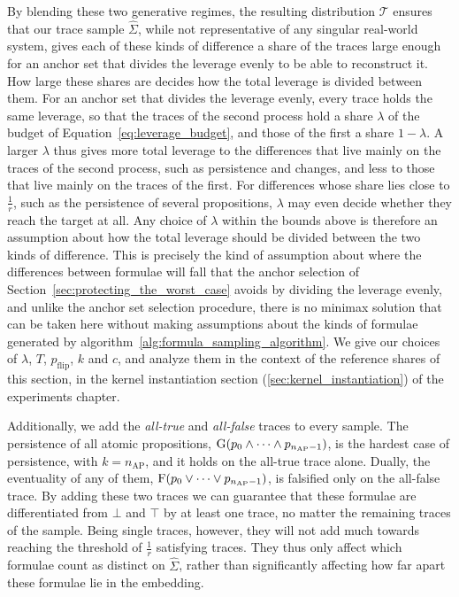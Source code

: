 \documentclass[titlepage,a4paper,11pt]{report}
\begin{document}
    By blending these two generative regimes, the resulting distribution $\mathcal{T}$ ensures that our trace sample $\widehat \Sigma$, while not representative of any singular real-world system, gives each of these kinds of difference a share of the traces large enough for an anchor set that divides the leverage evenly to be able to reconstruct it. How large these shares are decides how the total leverage is divided between them. For an anchor set that divides the leverage evenly, every trace holds the same leverage, so that the traces of the second process hold a share $\lambda$ of the budget of Equation~\eqref{eq:leverage_budget}, and those of the first a share $1-\lambda$. A larger $\lambda$ thus gives more total leverage to the differences that live mainly on the traces of the second process, such as persistence and changes, and less to those that live mainly on the traces of the first. For differences whose share lies close to $\frac1r$, such as the persistence of several propositions, $\lambda$ may even decide whether they reach the target at all. Any choice of $\lambda$ within the bounds above is therefore an assumption about how the total leverage should be divided between the two kinds of difference. This is precisely the kind of assumption about where the differences between formulae will fall that the anchor selection of Section~\ref{sec:protecting_the_worst_case} avoids by dividing the leverage evenly, and unlike the anchor set selection procedure, there is no minimax solution that can be taken here without making assumptions about the kinds of formulae generated by algorithm~\ref{alg:formula_sampling_algorithm}. We give our choices of $\lambda$, $T$, $p_{\text{flip}}$, $k$ and $c$, and analyze them in the context of the reference shares of this section, in the kernel instantiation section (\ref{sec:kernel_instantiation}) of the experiments chapter.
 
    Additionally, we add the \textit{all-true} and \textit{all-false} traces to every sample. The persistence of all atomic propositions, $\text{G}(p_0\land\dots\land p_{n_{\text{AP}}-1})$, is the hardest case of persistence, with $k=n_{\text{AP}}$, and it holds on the all-true trace alone. Dually, the eventuality of any of them, $\text{F}(p_0\lor\dots\lor p_{n_{\text{AP}}-1})$, is falsified only on the all-false trace. By adding these two traces we can guarantee that these formulae are differentiated from $\bot$ and $\top$ by at least one trace, no matter the remaining traces of the sample. Being single traces, however, they will not add much towards reaching the threshold of $\frac1r$ satisfying traces. They thus only affect which formulae count as distinct on $\widehat\Sigma$, rather than significantly affecting how far apart these formulae lie in the embedding.
 
\end{document}
